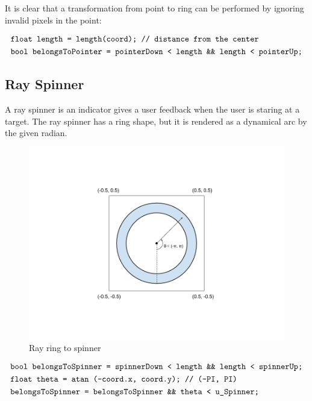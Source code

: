It is clear that a transformation from point to ring can be performed by ignoring invalid pixels in the point:

\[
\begin{array}{lr}
\begin{aligned}
&\texttt{float length = length(coord); // distance from the center}\\
&\texttt{bool belongsToPointer = pointerDown < length \&\& length < pointerUp;}\\
\end{aligned}
\end{array}
\]

\subsection{Ray Spinner}
\label{section:ray-spinner}

A ray spinner is an indicator gives a user feedback when the user is staring at a target. The ray spinner has a ring shape, but it is rendered as a dynamical arc by the given radian.

\begin{figure}[H]
\caption{Ray ring to spinner}
\label{fig:ray-ring2spinner}
\centering
\includegraphics[width=\textwidth, keepaspectratio]{Figures/ray-ring2spinner.png}
\decoRule
\end{figure}

\[
\begin{array}{lr}
\begin{aligned}
&\texttt{bool belongsToSpinner = spinnerDown < length \&\& length < spinnerUp;}\\
&\texttt{float theta = atan (-coord.x, coord.y); //  (-PI, PI)}\\
&\texttt{belongsToSpinner = belongsToSpinner \&\& theta < u\_Spinner;}\\
\end{aligned}
\end{array}
\]


